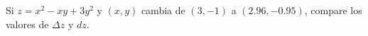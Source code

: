 \item Si $z = x^2 - xy + 3y^2$ y $(x, y)$ cambia de $(3, -1)$ a $(2.96, -0.95)$, compare los valores de $\Delta z$ y $dz$.
